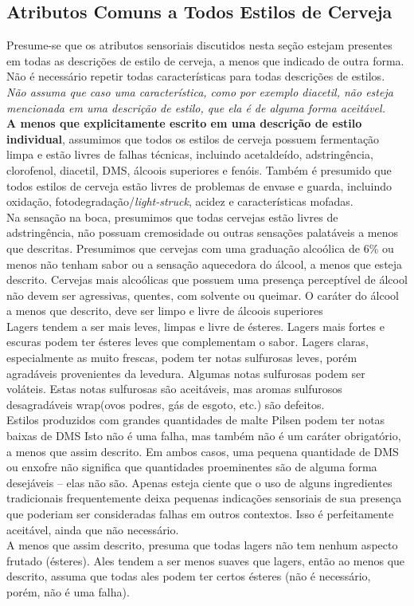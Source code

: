 \subsection*{Atributos Comuns a Todos Estilos de Cerveja}
Presume-se que os atributos sensoriais discutidos nesta seção estejam presentes em todas as descrições de estilo de cerveja, a menos que indicado de outra forma. Não é necessário repetir todas características para todas descrições de estilos. \textit{Não assuma que caso uma característica, como por exemplo diacetil, não esteja mencionada em uma descrição de estilo, que ela é de alguma forma aceitável.}\\
\textbf{A menos que explicitamente escrito em uma descrição de estilo individual}, assumimos que todos os estilos de cerveja possuem fermentação limpa e estão livres de falhas técnicas, incluindo acetaldeído, adstringência, clorofenol, diacetil, DMS, álcoois superiores e fenóis. Também é presumido que todos estilos de cerveja estão livres de problemas de envase e guarda, incluindo oxidação, fotodegradação/\textit{light-struck}, acidez e características mofadas.\\
Na sensação na boca, presumimos que todas cervejas estão livres de adstringência, não possuam cremosidade ou outras sensações palatáveis a menos que descritas. Presumimos que cervejas com uma graduação alcoólica de 6\% ou menos não tenham sabor ou a sensação aquecedora do álcool, a menos que esteja descrito. Cervejas mais alcoólicas que possuem uma presença perceptível de álcool não devem ser agressivas, quentes, com solvente ou queimar. O caráter do álcool a menos que descrito, deve ser limpo e livre de álcoois superiores\\
Lagers tendem a ser mais leves, limpas e livre de ésteres.  Lagers mais fortes e escuras podem ter ésteres leves que complementam o sabor. Lagers claras, especialmente as muito frescas, podem ter notas sulfurosas leves, porém agradáveis provenientes da levedura. Algumas notas sulfurosas podem ser voláteis. Estas notas sulfurosas são aceitáveis, mas aromas sulfurosos desagradáveis wrap(ovos podres, gás de esgoto, etc.) são defeitos.\\
Estilos produzidos com grandes quantidades de malte Pilsen podem ter notas baixas de DMS Isto não é uma falha, mas também não é um caráter obrigatório, a menos que assim descrito. Em ambos casos, uma pequena quantidade de DMS ou enxofre não significa que quantidades proeminentes são de alguma forma desejáveis – elas não são. Apenas esteja ciente que o uso de alguns ingredientes tradicionais frequentemente deixa pequenas indicações sensoriais de sua presença que poderiam ser consideradas falhas em outros contextos. Isso é perfeitamente aceitável, ainda que não necessário.\\
A menos que assim descrito, presuma que todas lagers não tem nenhum aspecto frutado (ésteres). Ales tendem a ser menos suaves que lagers, então ao menos que descrito, assuma que todas ales podem ter certos ésteres (não é necessário, porém, não é uma falha).
